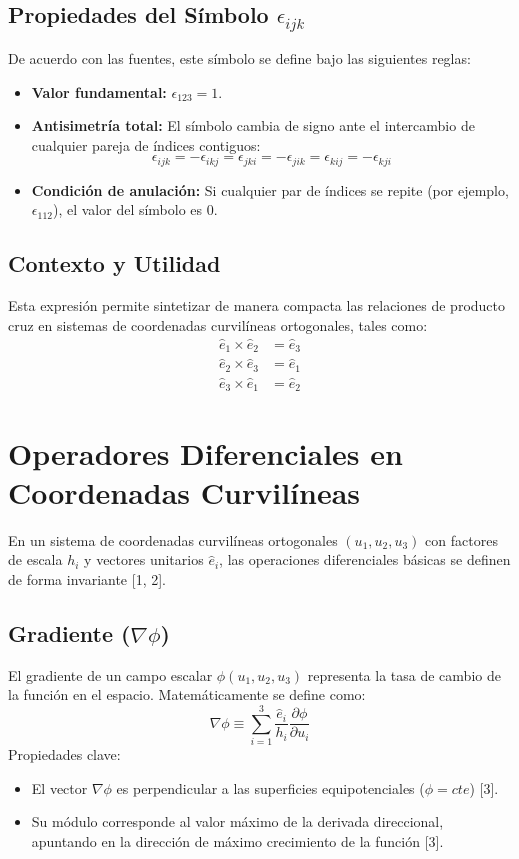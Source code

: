 \documentclass[a4paper]{article}
\begin{document}
\subsection{Propiedades del Símbolo $\epsilon_{ijk}$}
De acuerdo con las fuentes, este símbolo se define bajo las siguientes reglas:
\begin{itemize}
    \item \textbf{Valor fundamental:} $\epsilon_{123} = 1$.
    \item \textbf{Antisimetría total:} El símbolo cambia de signo ante el intercambio de cualquier pareja de índices contiguos:
    \begin{equation}
        \epsilon_{ijk} = -\epsilon_{ikj} = \epsilon_{jki} = -\epsilon_{jik} = \epsilon_{kij} = -\epsilon_{kji}
    \end{equation}
    \item \textbf{Condición de anulación:} Si cualquier par de índices se repite (por ejemplo, $\epsilon_{112}$), el valor del símbolo es $0$.
\end{itemize}

\subsection{Contexto y Utilidad}
Esta expresión permite sintetizar de manera compacta las relaciones de producto cruz en sistemas de coordenadas curvilíneas ortogonales, tales como:
\begin{align*}
    \hat{e}_1 \times \hat{e}_2 &= \hat{e}_3 \\
    \hat{e}_2 \times \hat{e}_3 &= \hat{e}_1 \\
    \hat{e}_3 \times \hat{e}_1 &= \hat{e}_2
\end{align*}

\section{Operadores Diferenciales en Coordenadas Curvilíneas}

En un sistema de coordenadas curvilíneas ortogonales $(u_1, u_2, u_3)$ con factores de escala $h_i$ y vectores unitarios $\hat{e}_i$, las operaciones diferenciales básicas se definen de forma invariante [1, 2].

\subsection{Gradiente ($\nabla \phi$)}
El gradiente de un campo escalar $\phi(u_1, u_2, u_3)$ representa la tasa de cambio de la función en el espacio. Matemáticamente se define como:
\begin{equation}
    \nabla\phi \equiv \sum_{i=1}^3 \frac{\hat{e}_i}{h_i} \frac{\partial \phi}{\partial u_i}
\end{equation}
Propiedades clave:
\begin{itemize}
    \item El vector $\nabla\phi$ es perpendicular a las superficies equipotenciales ($\phi = cte$) [3].
    \item Su módulo corresponde al valor máximo de la derivada direccional, apuntando en la dirección de máximo crecimiento de la función [3].
\end{itemize}
\end{document}
